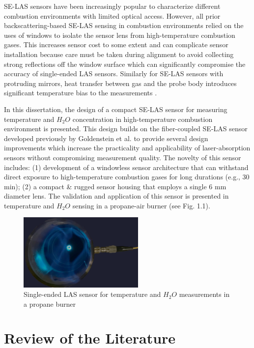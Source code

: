 SE-LAS sensors have been increasingly popular to characterize different combustion environments with limited optical access. However, all prior backscattering-based SE-LAS sensing in combustion environments relied on the uses of windows to isolate the sensor lens from high-temperature combustion gases. This increases sensor cost to some extent and can complicate sensor installation because care must be taken during alignment to avoid collecting strong reflections off the window surface which can significantly compromise the accuracy of single-ended LAS sensors. Similarly for SE-LAS sensors with protruding mirrors, heat transfer between gas and the probe body introduces significant temperature bias to the measurements \cite{Rein:10}. 

In this dissertation, the design of a compact SE-LAS sensor for measuring temperature and $H_2O$ concentration in high-temperature combustion environment is presented. This design builds on the fiber-coupled SE-LAS sensor developed previously by Goldenstein et al. \cite{Goldenstein:16} to provide several design improvements which increase the practicality and applicability of laser-absorption sensors without compromising measurement quality. The novelty of this sensor includes: (1) development of a windowless sensor architecture that can withstand direct exposure to high-temperature combustion gases for long durations (e.g., 30 min); (2) a compact \& rugged sensor housing that employs a single 6 mm diameter lens. The validation and application of this sensor is presented in temperature and $H_2O$ sensing in a propane-air burner (see Fig. 1.1).

\vspace{15mm}
\begin{figure}[ht]
    \centering
        \includegraphics[width=0.55\textwidth]{fig/ch1_fig1.png}
        \caption{Single-ended LAS sensor for temperature and ${H_2}O$ measurements in a propane burner}
    \label{fig:ch1_1}
\end{figure}

\section{Review of the Literature}
